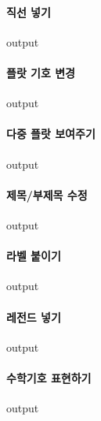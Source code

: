 \documentclass{book}
\begin{document}
\paragraph{직선 넣기}
\begin{Schunk}
\begin{Soutput}
output
\end{Soutput}
\end{Schunk}
\paragraph{플랏 기호 변경}
\begin{Schunk}
\begin{Soutput}
output
\end{Soutput}
\end{Schunk}
\paragraph{다중 플랏 보여주기}
\begin{Schunk}
\begin{Soutput}
output
\end{Soutput}
\end{Schunk}
\paragraph{제목/부제목 수정}
\begin{Schunk}
\begin{Soutput}
output
\end{Soutput}
\end{Schunk}
\paragraph{라벨 붙이기}
\begin{Schunk}
\begin{Soutput}
output
\end{Soutput}
\end{Schunk}
\paragraph{레전드 넣기}
\begin{Schunk}
\begin{Soutput}
output
\end{Soutput}
\end{Schunk}
\paragraph{수학기호 표현하기}
\begin{Schunk}
\begin{Soutput}
output
\end{Soutput}
\end{Schunk}
\end{document}
